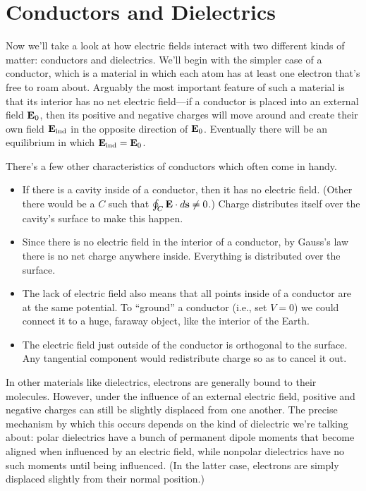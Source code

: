 \documentclass[../p051main.tex]{subfiles}
\begin{document}
\section{Conductors and Dielectrics}
Now we'll take a look at how electric fields interact with two different kinds of matter: conductors and dielectrics.
We'll begin with the simpler case of a conductor, which is a material in which each atom has at least one electron that's free to roam about.
Arguably the most important feature of such a material is that its interior has no net electric field---if a conductor is placed into an external field $\mathbf{E}_0$, then its positive and negative charges will move around and create their own field $\mathbf{E}_\textrm{ind}$ in the opposite direction of $\mathbf{E}_0$.
Eventually there will be an equilibrium in which $\mathbf{E}_\textrm{ind} = \mathbf{E}_0$.

There's a few other characteristics of conductors which often come in handy.
\begin{itemize}
    \item If there is a cavity inside of a conductor, then it has no electric field.
    (Other there would be a $C$ such that $\oint_C \mathbf{E} \cdot d\mathbf{s} \neq 0$.)
    Charge distributes itself over the cavity's surface to make this happen.

    \item Since there is no electric field in the interior of a conductor, by Gauss's law there is no net charge anywhere inside.
    Everything is distributed over the surface.

    \item The lack of electric field also means that all points inside of a conductor are at the same potential.
    To ``ground'' a conductor (i.e., set $V = 0$) we could connect it to a huge, faraway object, like the interior of the Earth.

    \item The electric field just outside of the conductor is orthogonal to the surface.
    Any tangential component would redistribute charge so as to cancel it out.
\end{itemize}

In other materials like dielectrics, electrons are generally bound to their molecules.
However, under the influence of an external electric field, positive and negative charges can still be slightly displaced from one another.
The precise mechanism by which this occurs depends on the kind of dielectric we're talking about: polar dielectrics have a bunch of permanent dipole moments that become aligned when influenced by an electric field, while nonpolar dielectrics have no such moments until being influenced.
(In the latter case, electrons are simply displaced slightly from their normal position.)
\end{document}
